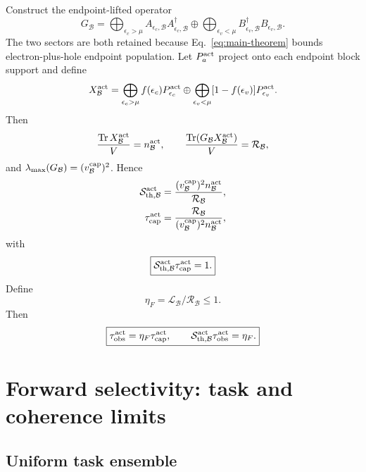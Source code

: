 \documentclass[aps,twocolumn,superscriptaddress,longbibliography]{revtex4-2}
\newcommand{\Tr}{\operatorname{Tr}}
\newcommand{\cB}{\mathcal B}
\newcommand{\cR}{\mathcal R}
\newcommand{\cL}{\mathcal L}
\newcommand{\cS}{\mathcal S}
\begin{document}
Construct the endpoint-lifted operator
\begin{equation}
G_{\cB}=\bigoplus_{\epsilon_c>\mu}A_{\epsilon_c,\cB}A_{\epsilon_c,\cB}^\dagger
\oplus
\bigoplus_{\epsilon_v<\mu}B_{\epsilon_v,\cB}^\dagger B_{\epsilon_v,\cB}.
\label{eq:Gthermal}
\end{equation}
The two sectors are both retained because Eq.~\eqref{eq:main-theorem} bounds electron-plus-hole endpoint population. Let $P_a^{\rm act}$ project onto each endpoint block support and define
\begin{equation}
X_{\cB}^{\rm act}=\bigoplus_{\epsilon_c>\mu} f(\epsilon_c)P_{\epsilon_c}^{\rm act}
\oplus
\bigoplus_{\epsilon_v<\mu}[1-f(\epsilon_v)]P_{\epsilon_v}^{\rm act}.
\end{equation}
Then
\begin{equation}
\frac{\Tr X_{\cB}^{\rm act}}{V}=n_{\cB}^{\rm act},
\qquad
\frac{\Tr(G_{\cB}X_{\cB}^{\rm act})}{V}=\cR_{\cB},
\end{equation}
and $\lambda_{\max}(G_{\cB})=(v_{\cB}^{\rm cap})^2$. Hence
\begin{align}
\cS_{\rm th,\cB}^{\rm act}&=\frac{(v_{\cB}^{\rm cap})^2n_{\cB}^{\rm act}}{\cR_{\cB}},\\
\tau_{\rm cap}^{\rm act}&=\frac{\cR_{\cB}}{(v_{\cB}^{\rm cap})^2n_{\cB}^{\rm act}},
\end{align}
with
\begin{equation}
\boxed{\cS_{\rm th,\cB}^{\rm act}\tau_{\rm cap}^{\rm act}=1.}
\end{equation}
Define
\begin{equation}
\eta_F=\cL_{\cB}/\cR_{\cB}\le1.
\end{equation}
Then
\begin{equation}
\boxed{\tau_{\rm obs}^{\rm act}=\eta_F\tau_{\rm cap}^{\rm act},
\qquad
\cS_{\rm th,\cB}^{\rm act}\tau_{\rm obs}^{\rm act}=\eta_F.}
\label{eq:thermal-reciprocity}
\end{equation}

\section{Forward selectivity: task and coherence limits}

\subsection{Uniform task ensemble}
\end{document}
